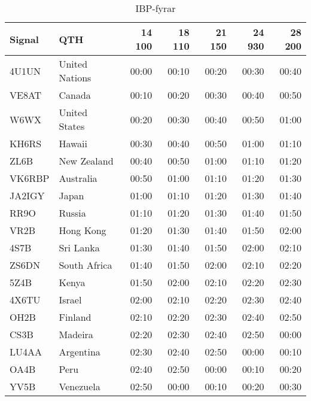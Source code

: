\begin{table}[H]
\centering
\begin{tabular}{llrrrrr}
\textbf{Signal} & \textbf{QTH} & \textbf{14 100} & \textbf{18 110} &
                \textbf{21 150} & \textbf{24 930} & \textbf{28 200} \\ \hline

4U1UN  & United Nations & 00:00  & 00:10  & 00:20  & 00:30  & 00:40  \\
VE8AT  & Canada         & 00:10  & 00:20  & 00:30  & 00:40  & 00:50  \\
W6WX   & United States  & 00:20  & 00:30  & 00:40  & 00:50  & 01:00  \\
KH6RS  & Hawaii         & 00:30  & 00:40  & 00:50  & 01:00  & 01:10  \\
ZL6B   & New Zealand    & 00:40  & 00:50  & 01:00  & 01:10  & 01:20  \\
VK6RBP & Australia      & 00:50  & 01:00  & 01:10  & 01:20  & 01:30  \\
JA2IGY & Japan          & 01:00  & 01:10  & 01:20  & 01:30  & 01:40  \\
RR9O   & Russia         & 01:10  & 01:20  & 01:30  & 01:40  & 01:50  \\
VR2B   & Hong Kong      & 01:20  & 01:30  & 01:40  & 01:50  & 02:00  \\
4S7B   & Sri Lanka      & 01:30  & 01:40  & 01:50  & 02:00  & 02:10  \\
ZS6DN  & South Africa   & 01:40  & 01:50  & 02:00  & 02:10  & 02:20  \\
5Z4B   & Kenya          & 01:50  & 02:00  & 02:10  & 02:20  & 02:30  \\
4X6TU  & Israel         & 02:00  & 02:10  & 02:20  & 02:30  & 02:40  \\
OH2B   & Finland        & 02:10  & 02:20  & 02:30  & 02:40  & 02:50  \\
CS3B   & Madeira        & 02:20  & 02:30  & 02:40  & 02:50  & 00:00  \\
LU4AA  & Argentina      & 02:30  & 02:40  & 02:50  & 00:00  & 00:10  \\
OA4B   & Peru           & 02:40  & 02:50  & 00:00  & 00:10  & 00:20  \\
YV5B   & Venezuela      & 02:50  & 00:00  & 00:10  & 00:20  & 00:30  \\
\end{tabular}
\caption{IBP-fyrar}
\end{table}

\normalsize

\clearpage


